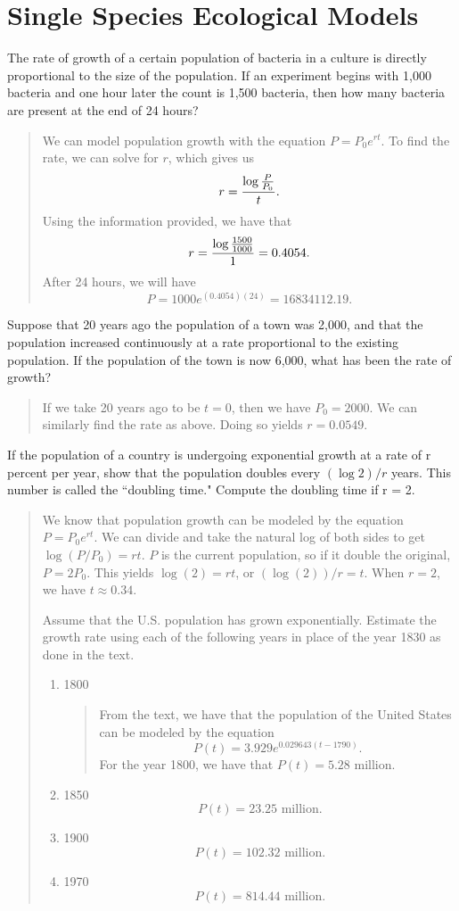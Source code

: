 \documentclass{hw}
\begin{document}
\section{Single Species Ecological Models}
\begin{enumerate}
\item The rate of growth of a certain population of bacteria in a culture is directly proportional
to the size of the population. If an experiment begins with 1,000 bacteria and one hour later
the count is 1,500 bacteria, then how many bacteria are present at the end of 24 hours?
\begin{quote}
We can model population growth with the equation $P = P_{0}e^{rt}$. To find the rate, we can solve
for $r$, which gives us
\[
r = {\log{P\over P_{0}}\over t}.
\]
Using the information provided, we have that
\[
r = {\log{1500\over 1000}\over 1} = 0.4054.
\]
After 24 hours, we will have
\[
P = 1000e^{(0.4054)(24)} = 16834112.19.
\]
\end{quote}

\item Suppose that 20 years ago the population of a town was 2,000, and that the population increased
continuously at a rate proportional to the existing population. If the population of the town is now
6,000, what has been the rate of growth?
\begin{quote}
If we take 20 years ago to be $t=0$, then we have $P_{0} = 2000$. We can similarly find the rate
as above. Doing so yields $r = 0.0549$.
\end{quote}

\item If the population of a country is undergoing exponential growth at a rate of r percent per
year, show that the population doubles every $(\log{2})/r$ years. This number is called the
``doubling time." Compute the doubling time if r = 2.
\begin{quote}
We know that population growth can be modeled by the equation $P = P_{0}e^{rt}$. We can divide and
take the natural log of both sides to get $\log{(P/P_{0})} = rt$. $P$ is the current population,
so if it double the original, $P = 2P_{0}$. This yields $\log{(2)} = rt$, or $(\log{(2)})/r = t$.
When $r=2$, we have $t \approx 0.34$.

\item Assume that the U.S. population has grown exponentially. Estimate the growth rate using
each of the following years in place of the year 1830 as done in the text.
\begin{enumerate}
\item 1800
\begin{quote}
From the text, we have that the population of the United States can be modeled by the equation
\[
P(t) = 3.929e^{0.029643(t - 1790)}.
\]
For the year 1800, we have that $P(t) = 5.28$ million.
\end{quote}
\item 1850
\[
P(t) = 23.25\text{ million}.
\]
\item 1900
\[
P(t) = 102.32\text{ million}.
\]
\item 1970
\[
P(t) = 814.44\text{ million}.
\]
\end{enumerate}
\end{quote}
\end{enumerate}
\end{document}
